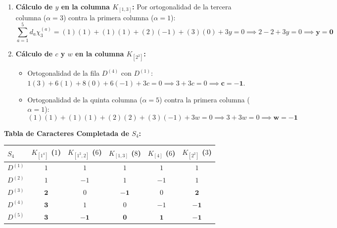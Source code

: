 \documentclass[11pt, a4paper]{article}
\begin{document}
\begin{enumerate}
    \item \textbf{Cálculo de $y$ en la columna $K_{[1, 3]}$:}
    Por ortogonalidad de la tercera columna ($\alpha = 3$) contra la primera columna ($\alpha = 1$):
    \[
    \sum_{a=1}^5 d_a \chi_3^{(a)} = (1)(1) + (1)(1) + (2)(-1) + (3)(0) + 3y = 0 \implies 2 - 2 + 3y = 0 \implies \mathbf{y = 0}
    \]
    \item \textbf{Cálculo de $c$ y $w$ en la columna $K_{[2^2]}$:}
    \begin{itemize}
        \item Ortogonalidad de la fila $D^{(4)}$ con $D^{(1)}$: $1(3) + 6(1) + 8(0) + 6(-1) + 3c = 0 \implies 3 + 3c = 0 \implies \mathbf{c = -1}$.
        \item Ortogonalidad de la quinta columna ($\alpha = 5$) contra la primera columna ($\alpha = 1$):
        \[
        (1)(1) + (1)(1) + (2)(2) + (3)(-1) + 3w = 0 \implies 3 + 3w = 0 \implies \mathbf{w = -1}
        \]
    \end{itemize}
\end{enumerate}

\textbf{Tabla de Caracteres Completada de $S_4$:}
\begin{center}
\begin{tabular}{lccccc}
\toprule
$S_4$ & $K_{[1^4]}$ ($1$) & $K_{[1^2, 2]}$ ($6$) & $K_{[1, 3]}$ ($8$) & $K_{[4]}$ ($6$) & $K_{[2^2]}$ ($3$) \\
\midrule
$D^{(1)}$ & $1$ & $1$ & $1$ & $1$ & $1$ \\
$D^{(2)}$ & $1$ & $-1$ & $1$ & $-1$ & $1$ \\
$D^{(3)}$ & $\mathbf{2}$ & $0$ & $\mathbf{-1}$ & $0$ & $\mathbf{2}$ \\
$D^{(4)}$ & $\mathbf{3}$ & $1$ & $0$ & $-1$ & $\mathbf{-1}$ \\
$D^{(5)}$ & $\mathbf{3}$ & $\mathbf{-1}$ & $\mathbf{0}$ & $\mathbf{1}$ & $\mathbf{-1}$ \\
\bottomrule
\end{tabular}
\end{center}
\end{document}
